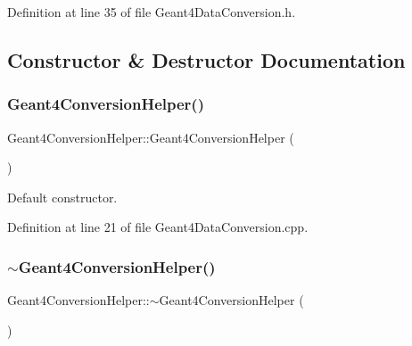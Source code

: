 Definition at line 35 of file Geant4\+Data\+Conversion.\+h.



\subsection{Constructor \& Destructor Documentation}
\hypertarget{class_d_d4hep_1_1_simulation_1_1_geant4_conversion_helper_a58610a40f83c77313587b7eb8eddcd40}{}\label{class_d_d4hep_1_1_simulation_1_1_geant4_conversion_helper_a58610a40f83c77313587b7eb8eddcd40} 
\subsubsection{\texorpdfstring{Geant4\+Conversion\+Helper()}{Geant4ConversionHelper()}}
{\footnotesize\ttfamily Geant4\+Conversion\+Helper\+::\+Geant4\+Conversion\+Helper (\begin{DoxyParamCaption}{ }\end{DoxyParamCaption})}



Default constructor. 



Definition at line 21 of file Geant4\+Data\+Conversion.\+cpp.

\hypertarget{class_d_d4hep_1_1_simulation_1_1_geant4_conversion_helper_ae69165a68948c43f52a9ef1f30b29ec0}{}\label{class_d_d4hep_1_1_simulation_1_1_geant4_conversion_helper_ae69165a68948c43f52a9ef1f30b29ec0} 
\subsubsection{\texorpdfstring{$\sim$\+Geant4\+Conversion\+Helper()}{~Geant4ConversionHelper()}}
{\footnotesize\ttfamily Geant4\+Conversion\+Helper\+::$\sim$\+Geant4\+Conversion\+Helper (\begin{DoxyParamCaption}{ }\end{DoxyParamCaption})\hspace{0.3cm}{\ttfamily [virtual]}}



